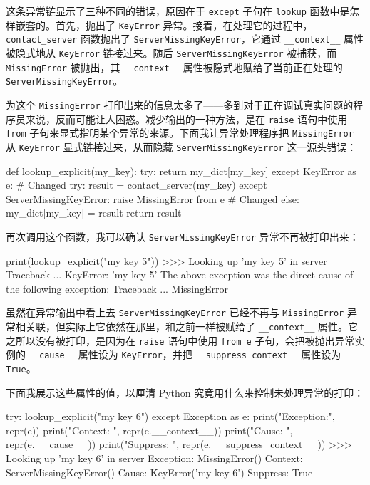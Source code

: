 这条异常链显示了三种不同的错误，原因在于 \texttt{except} 子句在 \texttt{lookup} 函数中是怎样嵌套的。首先，抛出了 \texttt{KeyError} 异常。接着，在处理它的过程中，\texttt{contact\_server} 函数抛出了 \texttt{ServerMissingKeyError}，它通过 \texttt{\_\_context\_\_} 属性被隐式地从 \texttt{KeyError} 链接过来。随后 \texttt{ServerMissingKeyError} 被捕获，而 \texttt{MissingError} 被抛出，其 \texttt{\_\_context\_\_} 属性被隐式地赋给了当前正在处理的 \texttt{ServerMissingKeyError}。

为这个 \texttt{MissingError} 打印出来的信息太多了——多到对于正在调试真实问题的程序员来说，反而可能让人困惑。减少输出的一种方法，是在 \texttt{raise} 语句中使用 \texttt{from} 子句来显式指明某个异常的来源。下面我让异常处理程序把 \texttt{MissingError} 从 \texttt{KeyError} 显式链接过来，从而隐藏 \texttt{ServerMissingKeyError} 这一源头错误：

\begin{codebox}[python]
def lookup_explicit(my_key):
    try:
        return my_dict[my_key]
    except KeyError as e:              # Changed
        try:
            result = contact_server(my_key)
        except ServerMissingKeyError:
            raise MissingError from e  # Changed
        else:
            my_dict[my_key] = result
            return result
\end{codebox}

再次调用这个函数，我可以确认 \texttt{ServerMissingKeyError} 异常不再被打印出来：

\begin{codebox}[python]
print(lookup_explicit("my key 5"))
>>>
Looking up 'my key 5' in server
Traceback ...
KeyError: 'my key 5'
The above exception was the direct cause of the following
exception:
Traceback ...
MissingError
\end{codebox}

虽然在异常输出中看上去 \texttt{ServerMissingKeyError} 已经不再与 \texttt{MissingError} 异常相关联，但实际上它依然在那里，和之前一样被赋给了 \texttt{\_\_context\_\_} 属性。它之所以没有被打印，是因为在 \texttt{raise} 语句中使用 \texttt{from e} 子句，会把被抛出异常实例的 \texttt{\_\_cause\_\_} 属性设为 \texttt{KeyError}，并把 \texttt{\_\_suppress\_context\_\_} 属性设为 \texttt{True}。

下面我展示这些属性的值，以厘清 Python 究竟用什么来控制未处理异常的打印：

\begin{codebox}[python]
try:
    lookup_explicit("my key 6")
except Exception as e:
    print("Exception:", repr(e))
    print("Context:  ", repr(e.__context__))
    print("Cause:    ", repr(e.__cause__))
    print("Suppress: ", repr(e.__suppress_context__))
>>>
Looking up 'my key 6' in server
Exception: MissingError()
Context:   ServerMissingKeyError()
Cause:     KeyError('my key 6')
Suppress:  True
\end{codebox}

